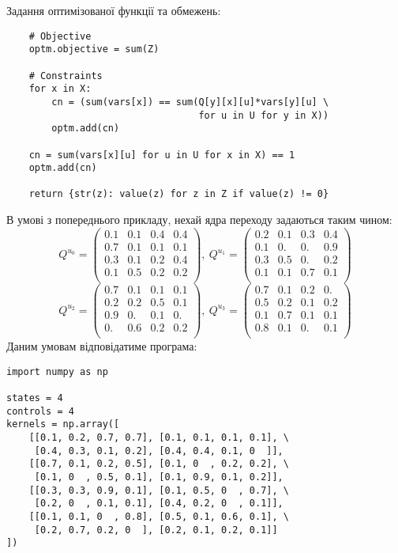 \documentclass[oneside,14pt]{extarticle}
\begin{document}
Задання оптимізованої функції та обмежень:
\begin{lstlisting}
    # Objective
    optm.objective = sum(Z)

    # Constraints
    for x in X:
        cn = (sum(vars[x]) == sum(Q[y][x][u]*vars[y][u] \
                                  for u in U for y in X))
        optm.add(cn)
       
    cn = sum(vars[x][u] for u in U for x in X) == 1
    optm.add(cn)

    return {str(z): value(z) for z in Z if value(z) != 0}
\end{lstlisting}

\begin{example} В умові з попереднього прикладу, нехай ядра переходу задаються таким чином:
\[Q^{u_0} = \left(\begin{matrix}
0.1 & 0.1 & 0.4 & 0.4 \\
0.7 & 0.1 & 0.1 & 0.1 \\
0.3 & 0.1 & 0.2 & 0.4 \\
0.1 & 0.5 & 0.2 & 0.2 \\
\end{matrix}\right),\
Q^{u_1} = \left(\begin{matrix}
0.2 & 0.1 & 0.3 & 0.4 \\
0.1 & 0.  & 0.  & 0.9 \\
0.3 & 0.5 & 0.  & 0.2 \\
0.1 & 0.1 & 0.7 & 0.1 \\
\end{matrix}\right) \]
\[Q^{u_2} = \left(\begin{matrix}
0.7 & 0.1 & 0.1 & 0.1 \\
0.2 & 0.2 & 0.5 & 0.1 \\
0.9 & 0.  & 0.1 & 0.  \\
0.  & 0.6 & 0.2 & 0.2 \\
\end{matrix}\right),\ 
Q^{u_3} = \left(\begin{matrix}
0.7 & 0.1 & 0.2 & 0.  \\
0.5 & 0.2 & 0.1 & 0.2 \\
0.1 & 0.7 & 0.1 & 0.1 \\
0.8 & 0.1 & 0.  & 0.1 \\
\end{matrix}\right) \]
Даним умовам відповідатиме програма:
\begin{lstlisting}
import numpy as np

states = 4
controls = 4
kernels = np.array([
    [[0.1, 0.2, 0.7, 0.7], [0.1, 0.1, 0.1, 0.1], \
     [0.4, 0.3, 0.1, 0.2], [0.4, 0.4, 0.1, 0  ]],
    [[0.7, 0.1, 0.2, 0.5], [0.1, 0  , 0.2, 0.2], \
     [0.1, 0  , 0.5, 0.1], [0.1, 0.9, 0.1, 0.2]],
    [[0.3, 0.3, 0.9, 0.1], [0.1, 0.5, 0  , 0.7], \
     [0.2, 0  , 0.1, 0.1], [0.4, 0.2, 0  , 0.1]],
    [[0.1, 0.1, 0  , 0.8], [0.5, 0.1, 0.6, 0.1], \
     [0.2, 0.7, 0.2, 0  ], [0.2, 0.1, 0.2, 0.1]]
])


\end{lstlisting}
\end{example}
\end{document}
